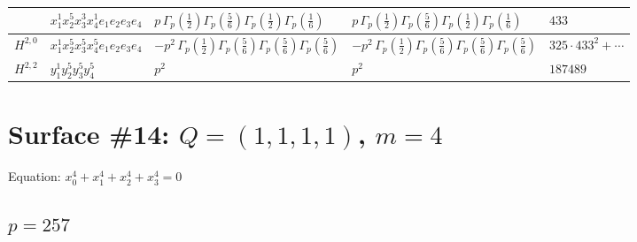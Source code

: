 \documentclass[11pt]{article}
\begin{document}
\begin{table}[ht]
{\begin{tabular}{@{}lllll@{}}
 & $x_{1}^{1} x_{2}^{5} x_{3}^{3} x_{4}^{1}  e_{1} e_{2} e_{3} e_{4}$ & $p \, \Gamma_p \left( \frac{1}{2} \right) \Gamma_p \left( \frac{5}{6} \right) \Gamma_p \left( \frac{1}{2} \right) \Gamma_p \left( \frac{1}{6} \right)$ & $p \, \Gamma_p \left( \frac{1}{2} \right) \Gamma_p \left( \frac{5}{6} \right) \Gamma_p \left( \frac{1}{2} \right) \Gamma_p \left( \frac{1}{6} \right)$ & $433$ \\
\midrule
$H^{2,0}$ & $x_{1}^{1} x_{2}^{5} x_{3}^{5} x_{4}^{5}  e_{1} e_{2} e_{3} e_{4}$ & $- p^{2} \, \Gamma_p \left( \frac{1}{2} \right) \Gamma_p \left( \frac{5}{6} \right) \Gamma_p \left( \frac{5}{6} \right) \Gamma_p \left( \frac{5}{6} \right)$ & $- p^{2} \, \Gamma_p \left( \frac{1}{2} \right) \Gamma_p \left( \frac{5}{6} \right) \Gamma_p \left( \frac{5}{6} \right) \Gamma_p \left( \frac{5}{6} \right)$ & $325{\cdot}433^{2}{+}\cdots$ \\
\midrule
$H^{2,2}$ & $y_{1}^{1} y_{2}^{5} y_{3}^{5} y_{4}^{5}$ & $p^{2} \,$ & $p^{2} \,$ & $187489$ \\
\bottomrule
\end{tabular}
}
\renewcommand{\arraystretch}{1.0}
\end{table}

\newpage

\section*{Surface \#14: $Q=(1, 1, 1, 1)$, $m=4$}

Equation: $x_0^{4} + x_1^{4} + x_2^{4} + x_3^{4} = 0$

\subsection*{$p = 257$}
\end{document}

